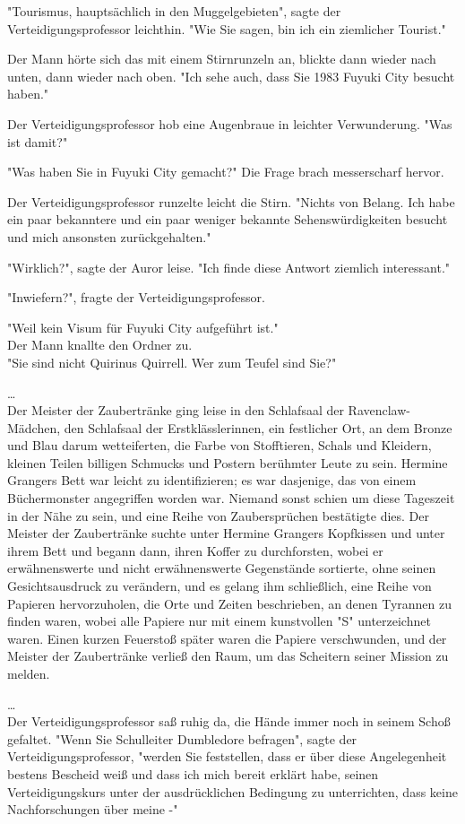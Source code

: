 {"Tourismus, hauptsächlich in den Muggelgebieten", sagte der Verteidigungsprofessor leichthin. "Wie Sie sagen, bin ich ein ziemlicher Tourist."

Der Mann hörte sich das mit einem Stirnrunzeln an, blickte dann wieder nach unten, dann wieder nach oben. "Ich sehe auch, dass Sie 1983 Fuyuki City besucht haben."

Der Verteidigungsprofessor hob eine Augenbraue in leichter Verwunderung. "Was ist damit?"

"Was haben Sie in Fuyuki City gemacht?" Die Frage brach messerscharf hervor.

Der Verteidigungsprofessor runzelte leicht die Stirn. "Nichts von Belang. Ich habe ein paar bekanntere und ein paar weniger bekannte Sehenswürdigkeiten besucht und mich ansonsten zurückgehalten."

"Wirklich?", sagte der Auror leise. "Ich finde diese Antwort ziemlich interessant."

"Inwiefern?", fragte der Verteidigungsprofessor.

"Weil kein Visum für Fuyuki City aufgeführt ist."\\ Der Mann knallte den Ordner zu.\\ "Sie sind nicht Quirinus Quirrell. Wer zum Teufel sind Sie?"

…\\ Der Meister der Zaubertränke ging leise in den Schlafsaal der Ravenclaw-Mädchen, den Schlafsaal der Erstklässlerinnen, ein festlicher Ort, an dem Bronze und Blau darum wetteiferten, die Farbe von Stofftieren, Schals und Kleidern, kleinen Teilen billigen Schmucks und Postern berühmter Leute zu sein. Hermine Grangers Bett war leicht zu identifizieren; es war dasjenige, das von einem Büchermonster angegriffen worden war. Niemand sonst schien um diese Tageszeit in der Nähe zu sein, und eine Reihe von Zaubersprüchen bestätigte dies. Der Meister der Zaubertränke suchte unter Hermine Grangers Kopfkissen und unter ihrem Bett und begann dann, ihren Koffer zu durchforsten, wobei er erwähnenswerte und nicht erwähnenswerte Gegenstände sortierte, ohne seinen Gesichtsausdruck zu verändern, und es gelang ihm schließlich, eine Reihe von Papieren hervorzuholen, die Orte und Zeiten beschrieben, an denen Tyrannen zu finden waren, wobei alle Papiere nur mit einem kunstvollen "S" unterzeichnet waren. Einen kurzen Feuerstoß später waren die Papiere verschwunden, und der Meister der Zaubertränke verließ den Raum, um das Scheitern seiner Mission zu melden.

…\\ Der Verteidigungsprofessor saß ruhig da, die Hände immer noch in seinem Schoß gefaltet. "Wenn Sie Schulleiter Dumbledore befragen", sagte der Verteidigungsprofessor, "werden Sie feststellen, dass er über diese Angelegenheit bestens Bescheid weiß und dass ich mich bereit erklärt habe, seinen Verteidigungskurs unter der ausdrücklichen Bedingung zu unterrichten, dass keine Nachforschungen über meine -"

}
